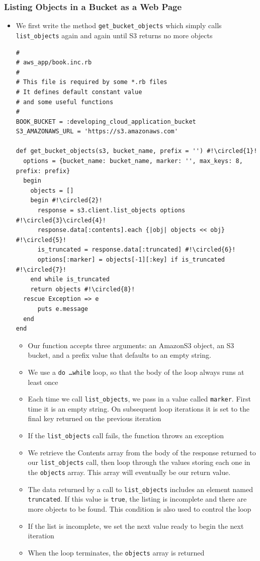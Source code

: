 \documentclass{beamer}
\newcommand*\circled[1]{\tikz[baseline=(char.base)]{
            \node[shape=circle,draw,inner sep=2pt] (char) {#1};}}
\begin{document}
\begin{frame}
\frametitle{Listing Objects in a Bucket as a Web Page}
\begin{itemize}
 \item We first write the method \texttt{get\_bucket\_objects} which simply calls \texttt{list\_objects} again 
and again until S3 returns no more objects

\lstset{language=Ruby, style=eclipse}
\begin{lstlisting}[escapechar=!]
#
# aws_app/book.inc.rb
#
# This file is required by some *.rb files
# It defines default constant value
# and some useful functions
#
BOOK_BUCKET = :developing_cloud_application_bucket
S3_AMAZONAWS_URL = 'https://s3.amazonaws.com'

def get_bucket_objects(s3, bucket_name, prefix = '') #!\circled{1}!
  options = {bucket_name: bucket_name, marker: '', max_keys: 8, prefix: prefix}
  begin
    objects = []
    begin #!\circled{2}!
      response = s3.client.list_objects options #!\circled{3}\circled{4}!
      response.data[:contents].each {|obj| objects << obj} #!\circled{5}!
      is_truncated = response.data[:truncated] #!\circled{6}!
      options[:marker] = objects[-1][:key] if is_truncated #!\circled{7}!
    end while is_truncated
    return objects #!\circled{8}!
  rescue Exception => e
      puts e.message
  end
end
\end{lstlisting}

\begin{itemize}
\item \circled{1} Our function accepts three arguments: an AmazonS3 object, an S3 bucket, and a prefix value that defaults to an empty string.
\item \circled{2} We use a \texttt{do \dots while} loop, so that the body of the loop always runs at least
once
\item \circled{3} Each time we call \texttt{list\_objects}, we pass in a value called \texttt{marker}. First time it is an empty string. On subsequent loop iterations it is set to the final key returned on the previous iteration
\item \circled{4} If the \texttt{list\_objects} call fails, the function throws an exception
\item \circled{5} We retrieve the Contents array from the body of the response returned to our
\texttt{list\_objects} call, then loop through the values storing each one in the \texttt{objects} array. This array will eventually be our return value.
\item \circled{6} The data returned by a call to \texttt{list\_objects} includes an element named
\texttt{truncated}. If this value is \texttt{true}, the listing is incomplete and
there are more objects to be found. This condition is also used to control the
loop
\item \circled{7} If the list is incomplete, we set the next value ready to begin the next iteration
\item \circled{8} When the loop terminates, the \texttt{objects} array is returned
\end{itemize}




\end{itemize}
\end{frame}
\end{document}
